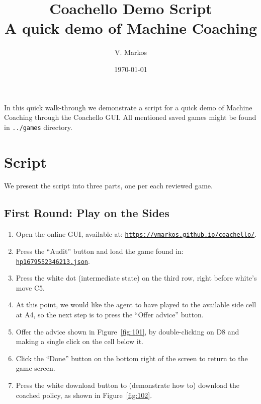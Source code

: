 \documentclass[a4paper,11pt]{article}
\title{\sffamily\LARGE\textbf{Coachello Demo Script}\\\Large A quick demo of Machine Coaching}
\author{\sffamily V. Markos}
\date{\sffamily\today}
\renewenvironment{abstract}
{\small
	\begin{center}
		\sffamily\bfseries \abstractname\vspace{-.5em}\vspace{0pt}
	\end{center}
	\list{}{%
		\setlength{\leftmargin}{35mm}
		\setlength{\rightmargin}{\leftmargin}%
	}%
	\item\relax}
{\endlist}
\theoremstyle{definition}
\theoremstyle{remark}
\numberwithin{equation}{section}
\begin{document}
	\maketitle
	
	\begin{abstract}
		In this quick walk-through we demonstrate a script for a quick demo of Machine Coaching through the Coachello GUI. All mentioned saved games might be found in \texttt{../games} directory.
	\end{abstract}

	\section{Script}\label{sec:Script}
	We present the script into three parts, one per each reviewed game.
	\subsection{First Round: Play on the Sides}\label{subsec:First Round}
	\begin{enumerate}
		\item Open the online GUI, available at: \href{https://vmarkos.github.io/coachello/}{\texttt{https://vmarkos.github.io/coachello/}}.
		\item Press the ``Audit'' button and load the game found in:  \href{../games/hp_47_17_1679552346213.json}{\texttt{hp\textunderscore 1679552346213.json}}.
	\end{enumerate}
	\begin{minipage}[c]{0.6\textwidth}
		\begin{enumerate}
			\setcounter{enumi}{2}
			\item Press the white dot (intermediate state) on the third row, right before white's move C5.			
			\item At this point, we would like the agent to have played to the available side cell at A4, so the next step is to press the ``Offer advice'' button.
			\item Offer the advice shown in Figure~\ref{fig:101}, by double-clicking on D8 and making a single click on the cell below it.
			\item Click the ``Done'' button on the bottom right of the screen to return to the game screen.
			\item Press the white download button to (demonstrate how to) download the coached policy, as shown in Figure~\ref{fig:102}.
		\end{enumerate}
	\end{minipage}\hfill
\end{document}
